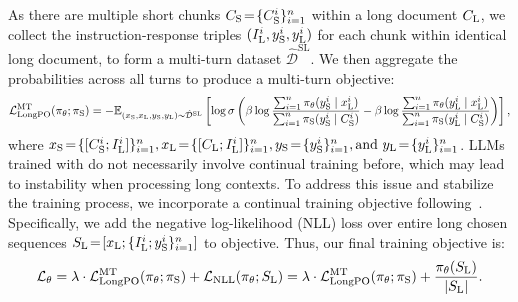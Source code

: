 As there are multiple short chunks $C_\text{S} \!=\! \{C_\text{S}^i\}_{i=1}^{n}$ within a long document $C_\textrm{L}$, we collect the instruction-response triples $(I_\text{L}^i, y_\text{S}^i, y_\text{L}^i)$ for each chunk within identical long document, to form a multi-turn dataset $\mathcal{\hat{D}}^{\text{SL}}$. We then aggregate the probabilities across all turns to produce a multi-turn \ourMethod{} objective:
\begin{equation}
    \label{eq:longpo_mt}
        \mathcal{L}_{\text{LongPO}}^{\text{MT}}(\pi_\theta; \pi_\text{S})
        = - \mathbb{E}_{(x_\text{S}, x_\text{L}, y_\text{S}, y_\text{L}) \sim \mathcal{\hat{D}}^{\text{SL}}}\left[ \log \sigma \left( \beta \log \frac{\sum_{i=1}^n \pi_\theta(y_\text{S}^i \mid x_\text{L}^i)}{\sum_{i=1}^n\pi_\text{S}(y_\text{S}^i \mid C_\text{S}^i)} - \beta \log \frac{\sum_{i=1}^n\pi_\theta(y_\text{L}^i \mid x_\text{L}^i)}{\sum_{i=1}^n\pi_\text{S}(y_\text{L}^i \mid C_\text{S}^i)}\right) \right],
\end{equation}
where $\xs\!=\!\{[\cs^i; \il^i]\}_{i=1}^n, \xl\!=\!\{[\cl; \il^i]\}_{i=1}^n, \ys\!=\!\{\ys^i\}_{i=1}^n, \text{and } \yl\!=\!\{\yl^i\}_{i=1}^n$. LLMs trained with \ourMethod{} do not necessarily involve continual training before, which may lead to instability when processing long contexts. To address this issue and stabilize the training process, we incorporate a continual training objective following~\citet{pang2024iterativereasoningpreferenceoptimization}. Specifically, we add the negative log-likelihood (NLL) loss over entire long chosen sequences $S_{\text{L}} \!=\! [x_\text{L}; \{I_\text{L}^{i};y_\text{S}^{i}\}_{i=1}^n]$ to \ourMethod{} objective. Thus, our final training objective is:
\begin{equation}
\label{eq:final_loss}
    \mathcal{L}_\theta = \lambda \cdot \mathcal{L}_{\text{LongPO}}^{\text{MT}}(\pi_\theta; \pi_\text{S}) + \mathcal{L}_\text{NLL}(\pi_\theta; S_{\text{L}}) = \lambda \cdot \mathcal{L}_{\text{LongPO}}^{\text{MT}}(\pi_\theta; \pi_\text{S}) + \frac{\pi_\theta(S_{\text{L}})}{\left| S_{\text{L}} \right|}.
\end{equation}